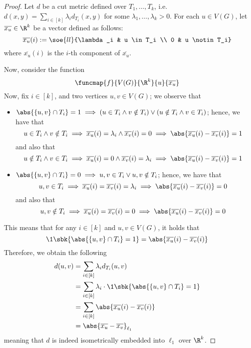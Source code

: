 \documentclass[a4paper, 12pt]{report}
\begin{document}
    \begin{proof}
        Let $d$ be a cut metric defined over $T_1, \ldots, T_k$, i.e. $d(x, y) = \sum_{i \in [k]}{\lambda_i d_{T_i}(x, y)}$ for some $\lambda_1, \ldots, \lambda_k > 0$. For each $u \in V(G)$, let $\overline{x_u} \in \R^k$ be a vector defined as follows: $$\overline{x_u}(i) := \soe{ll}{\lambda_i & u \in T_i \\ 0 & u \notin T_i}$$ where $\overline{x_u}(i)$ is the $i$-th component of $\overline{x_u}$.

        Now, consider the function $$\funcmap{f}{V(G)}{\R^k}{u}{\overline{x_u}}$$ Now, fix $i \in [k]$, and two vertices $u, v \in V(G)$; we observe that
        
        \begin{itemize}
            \item $\abs{\{u,v\} \cap T_i} = 1 \implies (u \in T_i \land v \notin T_i) \lor (u \notin T_i \land v \in T_i)$; hence, we have that $$u \in T_i \land v \notin T_i \implies \overline{x_u}(i) = \lambda_i \land \overline{x_v}(i)= 0 \implies \abs{\overline{x_u}(i) - \overline{x_v}(i)} = 1$$ and also that $$u \notin T_i \land v \in T_i \implies \overline{x_u}(i) = 0 \land \overline{x_v} (i) = \lambda_i \implies \abs{\overline{x_u}(i) - \overline{x_v}(i)} = 1$$
            \item $\abs{\{u, v\} \cap T_i} = 0 \implies u, v \in T_i \lor u, v \notin T_i$; hence, we have that $$u, v \in T_i \implies \overline{x_u}(i) = \overline{x_v}(i) = \lambda_i \implies \abs{\overline{x_u}(i) - \overline{x_v}(i)} = 0$$ and also that $$u, v \notin T_i \implies \overline{x_u}(i) = \overline{x_v}(i) = 0 \implies \abs{\overline{x_u}(i) - \overline{x_v}(i)} = 0$$
        \end{itemize}

        This means that for any $i \in [k]$ and $u, v \in V(G)$, it holds that $$\1 \sbk{\abs{\{u, v\} \cap T_i} = 1} = \abs{\overline{x_u}(i)- \overline{x_v}(i)}$$ Therefore, we obtain the following
        \begin{equation*}
            \begin{split}
                d(u, v) &= \sum_{i \in [k]}{\lambda_i d_{T_i}(u, v)} \\
                        &= \sum_{i \in [k]}{\lambda_i \cdot \1 \sbk{\abs{\{u, v\} \cap T_i} = 1}} \\
                        &= \sum_{i \in [k]}{\abs{\overline{x_u}(i) - \overline{x_v}(i)}} \\
                        &= \abs{\overline{x_u} - \overline{x_v}}_{\ell_1} \\
            \end{split}
        \end{equation*}
        meaning that $d$ is indeed isometrically embedded into $\ell_1$ over $\R^k$.
    \end{proof}
\end{document}
